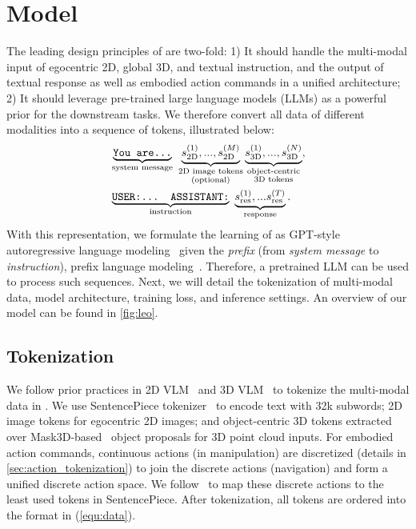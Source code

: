\documentclass{article}
\begin{document}
\section{Model}\label{sec:model}%
The leading design principles of \agent are two-fold: 1) It should handle the multi-modal input of egocentric 2D, global 3D, and textual instruction, and the output of textual response as well as embodied action commands in a unified architecture; 2) It should leverage pre-trained large language models (LLMs) as a powerful prior for the downstream tasks. We therefore convert all data of different modalities into a sequence of tokens, illustrated below:
\vskip -0.3in
\begin{equation}\label{equ:data}
\begin{split}
    &\underbrace{\text{\texttt{You are...}}}_{\text{system message}}~\underbrace{s_{\text{2D}}^{(1)},..., s_{\text{2D}}^{(M)}}_{\substack{\text{2D image tokens}\\ \text{(optional)}}}\underbrace{s_{\text{3D}}^{(1)},..., s_{\text{3D}}^{(N)}}_{\substack{\text{object-centric}\\\text{3D tokens}}},\\
    &\underbrace{\text{\texttt{USER:... ASSISTANT:}}}_{\text{instruction}}~\underbrace{s_{\text{res}}^{(1)},...s_{\text{res}}^{(T)}}_{\text{response}}.
\end{split}
\end{equation}
\vskip -0.2in
With this representation, we formulate the learning of \agent as GPT-style autoregressive language modeling~\citep{brown2020language} given the \textit{prefix} (from \textit{system message} to \textit{instruction}), \ie prefix language modeling~\citep{raffel2020exploring}. Therefore, a pretrained LLM can be used to process such sequences. Next, we will detail the tokenization of multi-modal data, model architecture, training loss, and inference settings. An overview of our model can be found in \cref{fig:leo}.
\vskip -0.5in

\subsection{Tokenization}\label{sec:model_tokenization}

We follow prior practices in 2D VLM~\citep{liu2023visual,alayrac2022flamingo} and 3D VLM~\citep{zhu20233d} to tokenize the multi-modal data in \agent. 
We use SentencePiece tokenizer~\citep{kudo2018sentencepiece} to encode text with 32k subwords; 2D image tokens for egocentric 2D images; and object-centric 3D tokens extracted over Mask3D-based~\citep{schult2022mask3d} object proposals for 3D point cloud inputs.
For embodied action commands, continuous actions (\eg in manipulation) are discretized (details in \cref{sec:action_tokenization}) to join the discrete actions (\eg navigation) and form a unified discrete action space. We follow~\cite{brohan2023rt} to map these discrete actions to the least used tokens in SentencePiece.
After tokenization, all tokens are ordered into the format in (\ref{equ:data}).
\end{document}
